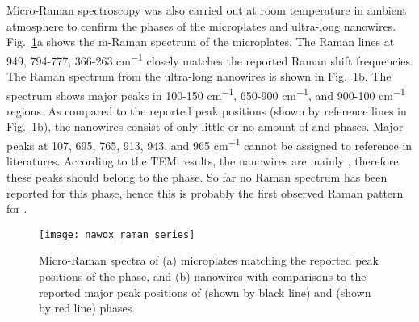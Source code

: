 Micro-Raman spectroscopy was also carried out at room temperature in ambient atmosphere to confirm the phases of the microplates and ultra-long nanowires. Fig.~\ref{fig:nawoxram}a shows the m-Raman spectrum of the microplates. The Raman lines at 949, 794-777, 366-263 \si{cm^{-1}} closely matches the reported  Raman shift frequencies.\cite{Fomichev1992} The Raman spectrum from the ultra-long nanowires is shown in Fig.~\ref{fig:nawoxram}b. The spectrum shows major peaks in 100-150 \si{cm^{-1}}, 650-900 \si{cm^{-1}}, and 900-100 \si{cm^{-1}} regions. As compared to the reported peak positions (shown by reference lines in Fig.~\ref{fig:nawoxram}b), the nanowires consist of only little or no amount of  and  phases. Major peaks at 107, 695, 765, 913, 943, and 965 \si{cm^{-1}} cannot be assigned to reference in literatures. According to the TEM results, the nanowires are mainly , therefore these peaks should belong to the  phase. So far no Raman spectrum has been reported for this phase, hence this is probably the first observed Raman pattern for .

\begin{figure}[htb]
\centering
\texttt{[image: nawox\_raman\_series]}
\caption[Raman spectra on ]{Micro-Raman spectra of (a) microplates matching the reported peak positions of the  phase, and (b) nanowires with comparisons to the reported major peak positions of  (shown by black line) and  (shown by red line) phases.}
\label{fig:nawoxram}
\end{figure}

